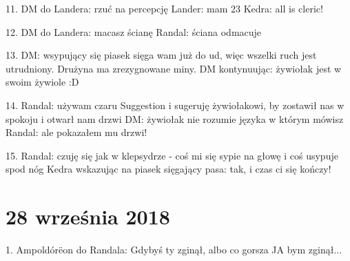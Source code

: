\documentclass[10pt,twoside,twocolumn]{book}
\begin{document}
11. DM do Landera: rzuć na percepcję
Lander: mam 23
Kedra: all is cleric!

12. DM do Landera: macasz ścianę
Randal: ściana odmacuje

13. DM: wsypujący się piasek sięga wam już do ud, więc wszelki ruch jest utrudniony.
Drużyna ma zrezygnowane miny.
DM kontynuując: żywiołak jest w swoim żywiole :D

14. Randal: używam czaru Suggestion i sugeruję żywiołakowi, by zostawił nas w spokoju i otwarł nam drzwi
DM: żywiołak nie rozumie języka w którym mówisz
Randal: ale pokazałem mu drzwi!

15. Randal: czuję się jak w klepsydrze - coś mi się sypie na głowę i coś usypuje spod nóg
Kedra wskazując na piasek sięgający pasa: tak, i czas ci się kończy!

\section{28 września 2018}

1. Ampoldórëon do Randala: Gdybyś ty zginął, albo co gorsza JA bym zginął...
\end{document}
